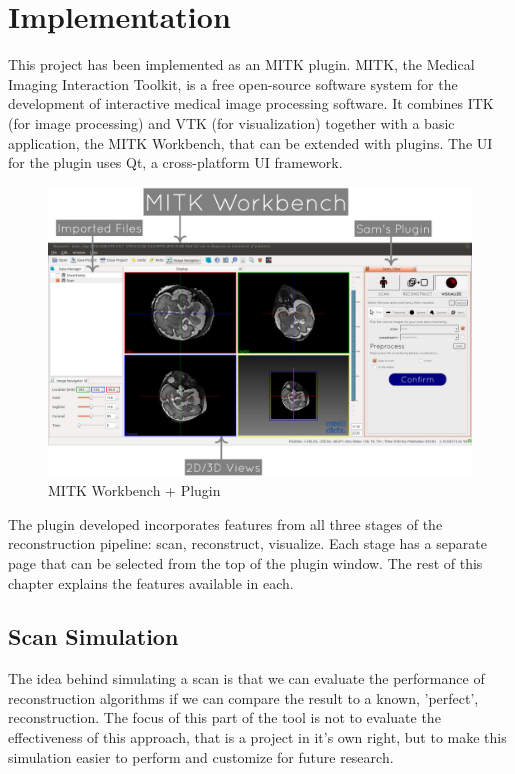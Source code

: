 \chapter{Implementation}\label{chapter:implementation}

This project has been implemented as an MITK plugin. MITK, the Medical Imaging Interaction Toolkit, is a free open-source software system for the development of interactive medical image processing software. It combines ITK (for image processing) and VTK (for visualization) together with a basic application, the MITK Workbench, that can be extended with plugins. The UI for the plugin uses Qt, a cross-platform UI framework.

\begin{figure}[H]
  \includegraphics[width=\textwidth]{images/tool/mitk.png}
  \caption{MITK Workbench + Plugin}\label{fig:mitkoverview}
\end{figure}

The plugin developed incorporates features from all three stages of the reconstruction pipeline: scan, reconstruct, visualize. Each stage has a separate page that can be selected from the top of the plugin window. The rest of this chapter explains the features available in each.

\clearpage
\section{Scan Simulation}\label{implementation:scan_simulation}
The idea behind simulating a scan is that we can evaluate the performance of reconstruction algorithms if we can compare the result to a known, 'perfect', reconstruction. The focus of this part of the tool is not to evaluate the effectiveness of this approach, that is a project in it's own right, but to make this simulation easier to perform and customize for future research.

